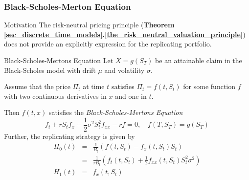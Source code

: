 \documentclass[11pt,a4paper]{article}
\begin{document}
\subsubsection{Black-Scholes-Merton Equation}

  \begin{remark}{Motivation}
    The risk-neutral pricing principle (\textbf{Theorem \ref{sec_discrete_time_models}.\ref{the_risk_neutral_valuation_principle}}) does not provide an explicitly expression for the replicating portfolio.
  \end{remark}

  \begin{theorem}{Black-Scholes-Mertons Equation}\label{eqn_black_scholes_mertons}
    Let $X=g(S_T)$ be an attainable claim in the Black-Scholes model with drift $\mu$ and volatility $\sigma$.
    \par Assume that the price $\Pi_t$ at time $t$ satisfies $\Pi_t=f(t,S_t)$ for some function $f$ with two continuous derivatives in $x$ and one in $t$.
    \par Then $f(t,x)$ satisfies the \textit{Black-Scholes-Mertons Equation}
    \[ f_t+rS_tf_x+\frac12\sigma^2S_t^2f_{xx}-rf=0,\quad f(T,S_T)=g(S_T) \]
    Further, the replicating strategy is given by
    \[\begin{array}{rcl}
      H_0(t)&=&\frac1{B_t}\left(f(t,S_t)-f_x(t,S_t)S_t\right)\\
      &=&\frac{1}{rB_t}\left(f_t(t,S_t)+\frac12f_{xx}(t,S_t)S_t^2\sigma^2\right)\\
      H_1(t)&=&f_x(t,S_t)
    \end{array}\]
  \end{theorem}
\end{document}
